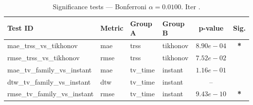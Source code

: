 ﻿%
\begin{table}[ht]
\centering
\caption[EEG reconstruction - Iteration it26]{Significance tests — Bonferroni $\alpha=0.0100$. Iter .}
\label{tab:sig_it26_synthetic_beta_all_graphs}
\small
\begin{tabular}{llllcc}
\toprule
Test ID & Metric & Group A & Group B & p-value & Sig. \\
\midrule
mae\_trss\_vs\_tikhonov & mae & trss & tikhonov & $8.90e-04$ & \textbf{*} \\
rmse\_trss\_vs\_tikhonov & rmse & trss & tikhonov & $7.52e-02$ &  \\
mae\_tv\_family\_vs\_instant & mae & tv\_time & instant & $1.16e-01$ &  \\
dtw\_tv\_family\_vs\_instant & dtw & tv\_time & instant & -- &  \\
rmse\_tv\_family\_vs\_instant & rmse & tv\_time & instant & $9.43e-10$ & \textbf{*} \\
\bottomrule
\end{tabular}
\end{table}







